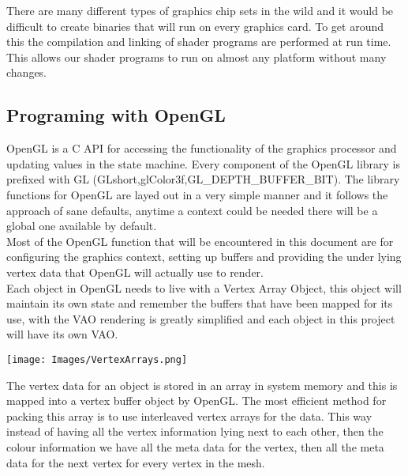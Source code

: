 There are many different types of graphics chip sets in the wild and it would be
difficult to create binaries that will run on every graphics card. To get around
this the compilation and linking of shader programs are performed at run time.
This allows our shader programs to run on almost any platform without many
changes.\\ 

\subsection{Programing with OpenGL}
OpenGL is a C API for accessing the functionality of the graphics processor and
updating values in the state machine. Every component of the OpenGL library is
prefixed with GL (GLshort,glColor3f,GL\_DEPTH\_BUFFER\_BIT). 
The library functions for OpenGL are layed out in a very simple manner and it
follows the approach of sane defaults, anytime a context could be needed there 
will be a global one available by default.\\

Most of the OpenGL function that will be encountered in this document are for
configuring the graphics context, setting up buffers and providing the under
lying vertex data that OpenGL will actually use to render.\\

Each object in OpenGL needs to live with a Vertex Array Object, this object will
maintain its own state and remember the buffers that have been mapped for its 
use, with the VAO rendering is greatly simplified and each object in this
project will have its own VAO.\\

\begin{center}
\texttt{[image: Images/VertexArrays.png]}
\end{center}

The vertex data for an object is stored in an array in system memory and this is
mapped into a vertex buffer object by OpenGL. The most efficient method for 
packing this array is to use interleaved vertex arrays for the data. This way
instead of having all the vertex information lying next to each other, then the
colour information we have all the meta data for the vertex, then all the meta
data for the next vertex for every vertex in the mesh.\\


